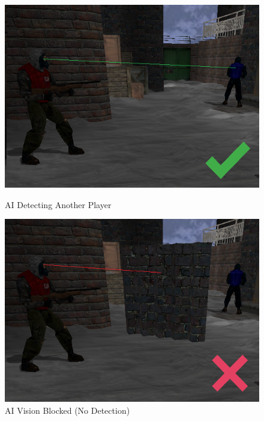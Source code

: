 \documentclass[11pt,a4paper]{article}
\begin{document}
\begin{figure}[H]
    \centering
    \begin{minipage}[b]{0.45\textwidth}
        \centering
        \includegraphics[width=\textwidth]{tracelineCollision.png}
        \caption{AI Detecting Another Player}
        \label{fig:one}
    \end{minipage}
    \hfill
    \begin{minipage}[b]{0.45\textwidth}
        \centering
        \includegraphics[width=\textwidth]{tracelineNoCollision.png}
        \caption{AI Vision Blocked (No Detection)}
        \label{fig:two}
    \end{minipage}
\end{figure}
\end{document}
